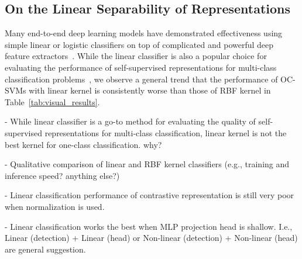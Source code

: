 \documentclass{article} \usepackage{iclr2021_conference,times}
\begin{document}
\iffalse
\begin{figure}
    \centering
    \begin{subfigure}{.45\textwidth}
        \centering
        \texttt{[image: cifar10\_ab\_linear\_vs\_kernel\_rot.pdf]}
    \caption{Rotation prediction loss.}
    \label{fig:ab_linear_vs_kernel_rot}
    \end{subfigure}
    \centering
    \begin{subfigure}{.45\textwidth}
        \centering
        \texttt{[image: cifar10\_ab\_linear\_vs\_kernel\_clr.pdf]}
    \caption{Contrastive loss.}
    \label{fig:ab_linear_vs_kernel_clr}
    \end{subfigure}
    \caption{Ablation study of self-supervised representations trained using various depths of MLP projection head and their compatibility to OC-SVMs with different kernels (linear or RBF).}
    \label{fig:ab_linear_vs_kernel}
\end{figure}
\fi

\iffalse
\subsection{On the Linear Separability of Representations}
\label{sec:ablation_classifier}

Many end-to-end deep learning models have demonstrated effectiveness using simple linear or logistic classifiers on top of complicated and powerful deep feature extractors~\citep{krizhevsky2012imagenet,ren2015faster,chen2017deeplab}. While the linear classifier is also a popular choice for evaluating the performance of self-supervised representations for multi-class classification problems~\citep{chen2020simple,he2020momentum,grill2020bootstrap}, we observe a general trend that the performance of OC-SVMs with linear kernel is consistently worse than those of RBF kernel in Table~\ref{tab:visual_results}.


- While linear classifier is a go-to method for evaluating the quality of self-supervised representations for multi-class classification, linear kernel is not the best kernel for one-class classification. {\color{red} why?}

- Qualitative comparison of linear and RBF kernel classifiers (e.g., training and inference speed? anything else?)

- Linear classification performance of contrastive representation is still very poor when normalization is used.

- Linear classification works the best when MLP projection head is shallow. I.e., Linear (detection) + Linear (head) or Non-linear (detection) + Non-linear (head) are general suggestion.
\end{document}
